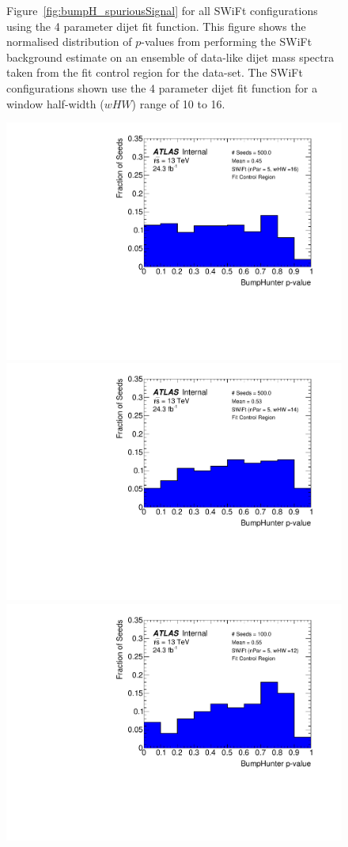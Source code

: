 \begin{figure}[!htb]
{}\hspace{-3mm}
\caption[Figure~\ref{fig:bumpH_spuriousSignal} for all SWiFt configurations using the 4 parameter dijet fit function.]
 {\label{fig:app-bumpH_spuriousSignal_4para}
 Figure~\ref{fig:bumpH_spuriousSignal} for all SWiFt configurations using the 4 parameter dijet fit function.
  This figure shows the normalised distribution of \bh{} $p$-values from performing the SWiFt background estimate on an ensemble of
  data-like dijet mass spectra taken from the fit control region for the \lm{} data-set.
  The SWiFt configurations shown use the 4 parameter dijet fit function for a window half-width ($wHW$) range of 10 to 16.
}
\end{figure}

\begin{figure}[!htb]
\captionsetup[subfigure]{aboveskip=0pt,justification=centering}
 {                                                    
  \includegraphics[width=0.48\linewidth, angle=0]{figs/Dibjet/LowMass/FitStudy_min566/pVal_bumpHunter_corrFitCR_5para_low16_high16.pdf}
}\hspace{-3mm}                                       
 {                                                    
  \includegraphics[width=0.48\linewidth, angle=0]{figs/Dibjet/LowMass/FitStudy_min566/pVal_bumpHunter_corrFitCR_5para_low14_high14.pdf}
}\hspace{-3mm}                                       
 {                                                    
  \includegraphics[width=0.48\linewidth, angle=0]{figs/Dibjet/LowMass/FitStudy_min566/pVal_bumpHunter_corrFitCR_5para_low12_high12.pdf}
}
\end{figure}
